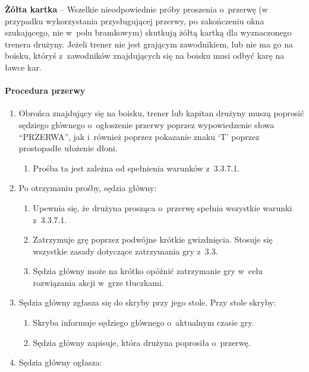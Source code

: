 \documentclass[12pt]{article}
\newcommand\yellowcard[1]{\bgroup\textcolor{darkyellow}{\textbf{#1}}}
\begin{document}
\yellowcard{Żółta kartka} -- Wszelkie nieodpowiednie próby proszenia o~przerwę
(w przypadku wykorzystania przysługującej przerwy, po zakończeniu okna
szukającego, nie w~polu bramkowym) skutkują żółtą kartką dla
wyznaczonego trenera drużyny. Jeżeli trener nie jest grającym
zawodnikiem, lub nie ma go na boisku, któryś z~zawodników znajdujących
się na boisku musi odbyć karę na ławce kar.

\paragraph{Procedura przerwy}

\begin{enumerate}
	\item
	      Obrońca znajdujący się na boisku, trener lub kapitan drużyny muszą
	      poprosić sędziego głównego o~ogłoszenie przerwy poprzez wypowiedzenie
	      słowa ``PRZERWA'', jak i~również poprzez pokazanie znaku `T' poprzez
	      prostopadłe ułożenie dłoni.

	      \begin{enumerate}
		      \item
		            Prośba ta jest zależna od spełnienia warunków z~3.3.7.1.
	      \end{enumerate}
	\item
	      Po otrzymaniu prośby, sędzia główny:

	      \begin{enumerate}
		      \item
		            Upewnia się, że drużyna prosząca o~przerwę spełnia wszystkie warunki
		            z~3.3.7.1.
		      \item
		            Zatrzymuje grę poprzez podwójne krótkie gwizdnięcia. Stosuje się
		            wszystkie zasady dotyczące zatrzymania gry z~3.3.
		      \item
		            Sędzia główny może na krótko opóźnić zatrzymanie gry w~celu
		            rozwiązania akcji w~grze tłuczkami.
	      \end{enumerate}
	\item
	      Sędzia główny zgłasza się do skryby przy jego stole. Przy stole
	      skryby:

	      \begin{enumerate}
		      \item
		            Skryba informuje sędziego głównego o~aktualnym czasie gry.
		      \item
		            Sędzia główny zapisuje, która drużyna poprosiła o~przerwę.
	      \end{enumerate}
	\item
	      Sędzia główny ogłasza:


\end{enumerate}
\end{document}

